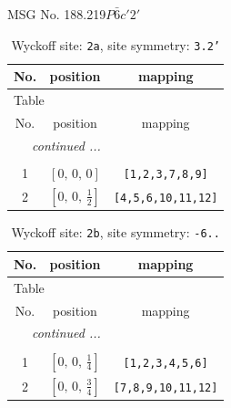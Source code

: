 \documentclass[fleqn,8pt]{jsarticle}
\begin{document}
\setcounter{MaxMatrixCols}{32}

\renewcommand{\tablename}{Table~}
\renewcommand{\figurename}{Figure~}
\begin{center}
\LARGE
MSG No. 188.219\quad$P\bar{6}c'2'$
\end{center}
\renewcommand{\arraystretch}{1.2}
\begin{longtable}{ccc}
\caption{Wyckoff site: {\tt 2a}, site symmetry: {\tt 3.2'}}
 \\
 \hline \hline
No. & position & mapping \\ \hline \endfirsthead

\multicolumn{2}{l}{\tablename\ \thetable{}} \\
 \hline \hline
No. & position & mapping \\ \hline \endhead

 \hline \hline
\multicolumn{2}{r}{\footnotesize\it continued ...} \\ \endfoot

 \hline \hline
\multicolumn{2}{r}{} \\ \endlastfoot

1 & $\left[ 0,\, 0,\, 0 \right]$ & {\tt [1,2,3,7,8,9]} \\ \hline
2 & $\left[ 0,\, 0,\, \frac{1}{2} \right]$ & {\tt [4,5,6,10,11,12]} \\
\end{longtable}
\renewcommand{\arraystretch}{1.2}
\begin{longtable}{ccc}
\caption{Wyckoff site: {\tt 2b}, site symmetry: {\tt -6..}}
 \\
 \hline \hline
No. & position & mapping \\ \hline \endfirsthead

\multicolumn{2}{l}{\tablename\ \thetable{}} \\
 \hline \hline
No. & position & mapping \\ \hline \endhead

 \hline \hline
\multicolumn{2}{r}{\footnotesize\it continued ...} \\ \endfoot

 \hline \hline
\multicolumn{2}{r}{} \\ \endlastfoot

1 & $\left[ 0,\, 0,\, \frac{1}{4} \right]$ & {\tt [1,2,3,4,5,6]} \\ \hline
2 & $\left[ 0,\, 0,\, \frac{3}{4} \right]$ & {\tt [7,8,9,10,11,12]} \\
\end{longtable}
\end{document}
